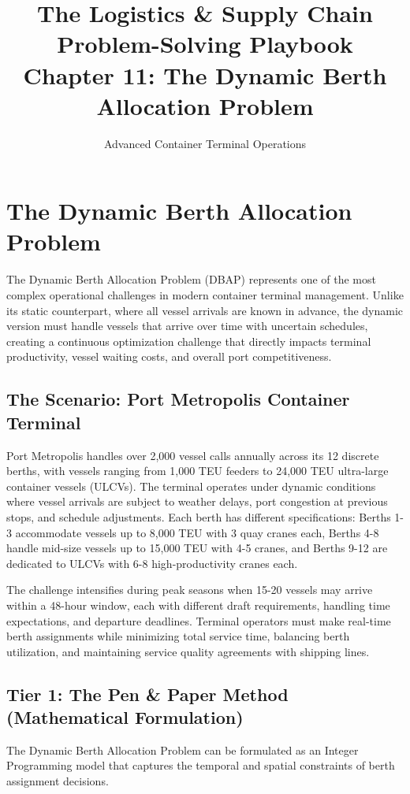\documentclass{article}
\title{The Logistics \& Supply Chain Problem-Solving Playbook\\Chapter 11: The Dynamic Berth Allocation Problem}
\author{Advanced Container Terminal Operations}
\date{}
\begin{document}
\maketitle

\section{The Dynamic Berth Allocation Problem}

The Dynamic Berth Allocation Problem (DBAP) represents one of the most complex operational challenges in modern container terminal management. Unlike its static counterpart, where all vessel arrivals are known in advance, the dynamic version must handle vessels that arrive over time with uncertain schedules, creating a continuous optimization challenge that directly impacts terminal productivity, vessel waiting costs, and overall port competitiveness.

\subsection{The Scenario: Port Metropolis Container Terminal}

Port Metropolis handles over 2,000 vessel calls annually across its 12 discrete berths, with vessels ranging from 1,000 TEU feeders to 24,000 TEU ultra-large container vessels (ULCVs). The terminal operates under dynamic conditions where vessel arrivals are subject to weather delays, port congestion at previous stops, and schedule adjustments. Each berth has different specifications: Berths 1-3 accommodate vessels up to 8,000 TEU with 3 quay cranes each, Berths 4-8 handle mid-size vessels up to 15,000 TEU with 4-5 cranes, and Berths 9-12 are dedicated to ULCVs with 6-8 high-productivity cranes each.

The challenge intensifies during peak seasons when 15-20 vessels may arrive within a 48-hour window, each with different draft requirements, handling time expectations, and departure deadlines. Terminal operators must make real-time berth assignments while minimizing total service time, balancing berth utilization, and maintaining service quality agreements with shipping lines.

\subsection{Tier 1: The Pen \& Paper Method (Mathematical Formulation)}

The Dynamic Berth Allocation Problem can be formulated as an Integer Programming model that captures the temporal and spatial constraints of berth assignment decisions.
\end{document}
